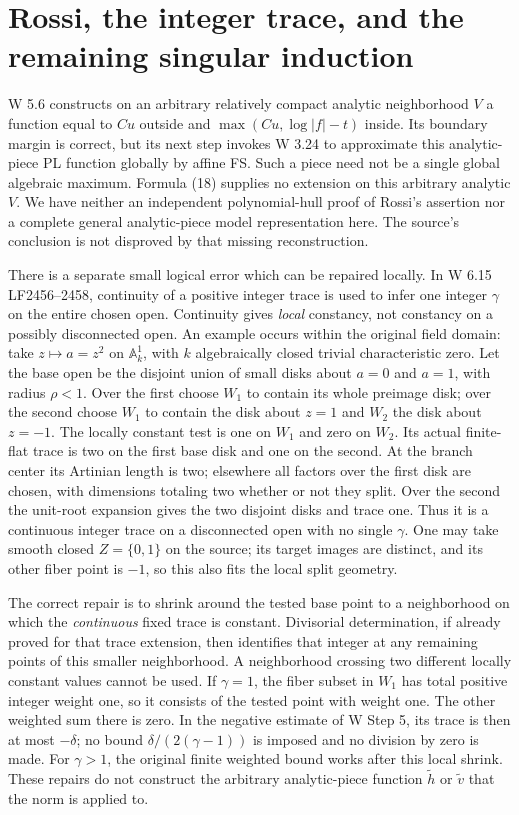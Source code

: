 \documentclass[
  11pt,
]{article}
\begin{document}
\section{Rossi, the integer trace, and the remaining singular
induction}\label{rossi-the-integer-trace-and-the-remaining-singular-induction}

W 5.6 constructs on an arbitrary relatively compact analytic
neighborhood \(V\) a function equal to \(Cu\) outside and
\(\max(Cu,\log|f|-t)\) inside. Its boundary margin is correct, but its
next step invokes W 3.24 to approximate this analytic-piece PL function
globally by affine FS. Such a piece need not be a single global
algebraic maximum. Formula (18) supplies no extension on this arbitrary
analytic \(V\). We have neither an independent polynomial-hull proof of
Rossi's assertion nor a complete general analytic-piece model
representation here. The source's conclusion is not disproved by that
missing reconstruction.

There is a separate small logical error which can be repaired locally.
In W 6.15 LF2456--2458, continuity of a positive integer trace is used
to infer one integer \(\gamma\) on the entire chosen open. Continuity
gives \emph{local} constancy, not constancy on a possibly disconnected
open. An example occurs within the original field domain: take
\(z\mapsto a=z^2\) on \(\mathbb A^1_k\), with \(k\) algebraically closed
trivial characteristic zero. Let the base open be the disjoint union of
small disks about \(a=0\) and \(a=1\), with radius \(\rho<1\). Over the
first choose \(W_1\) to contain its whole preimage disk; over the second
choose \(W_1\) to contain the disk about \(z=1\) and \(W_2\) the disk
about \(z=-1\). The locally constant test is one on \(W_1\) and zero on
\(W_2\). Its actual finite-flat trace is two on the first base disk and
one on the second. At the branch center its Artinian length is two;
elsewhere all factors over the first disk are chosen, with dimensions
totaling two whether or not they split. Over the second the unit-root
expansion gives the two disjoint disks and trace one. Thus it is a
continuous integer trace on a disconnected open with no single
\(\gamma\). One may take smooth closed \(Z=\{0,1\}\) on the source; its
target images are distinct, and its other fiber point is \(-1\), so this
also fits the local split geometry.

The correct repair is to shrink around the tested base point to a
neighborhood on which the \emph{continuous} fixed trace is constant.
Divisorial determination, if already proved for that trace extension,
then identifies that integer at any remaining points of this smaller
neighborhood. A neighborhood crossing two different locally constant
values cannot be used. If \(\gamma=1\), the fiber subset in \(W_1\) has
total positive integer weight one, so it consists of the tested point
with weight one. The other weighted sum there is zero. In the negative
estimate of W Step 5, its trace is then at most \(-\delta\); no bound
\(\delta/(2(\gamma-1))\) is imposed and no division by zero is made. For
\(\gamma>1\), the original finite weighted bound works after this local
shrink. These repairs do not construct the arbitrary analytic-piece
function \(\widetilde h\) or \(\widetilde v\) that the norm is applied
to.
\end{document}
